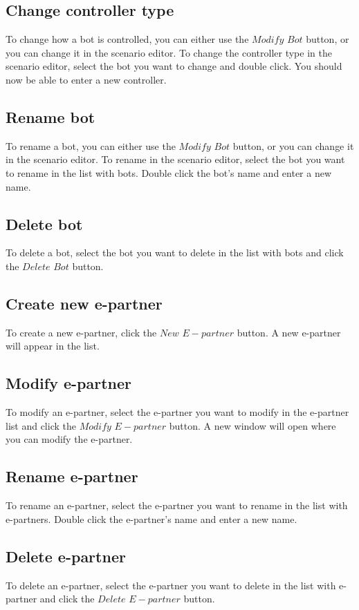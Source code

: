 \documentclass[a4paper]{article}
\begin{document}
\subsection{Change controller type}
To change how a bot is controlled, you can either use the $Modify$ $Bot$ button, or you can change it in the scenario editor. To change the controller type in the scenario editor, select the bot you want to change and double click. You should now be able to enter a new controller.

\subsection{Rename bot}
To rename a bot, you can either use the $Modify$ $Bot$ button, or you can change it in the scenario editor. To rename in the scenario editor, select the bot you want to rename in the list with bots. Double click the bot's name and enter a new name. %

\subsection{Delete bot}
To delete a bot, select the bot you want to delete in the list with bots and click the $Delete$ $Bot$ button.

\subsection{Create new e-partner}
To create a new e-partner, click the $New$ $E-partner$ button. A new e-partner will appear in the list.%

\subsection{Modify e-partner}
To modify an e-partner, select the e-partner you want to modify in the e-partner list and click the $Modify$ $E-partner$ button. A new window will open where you can modify the e-partner.

\subsection{Rename e-partner}
To rename an e-partner, select the e-partner you want to rename in the list with e-partners. Double click the e-partner's name and enter a new name. %

\subsection{Delete e-partner}
To delete an e-partner, select the e-partner you want to delete in the list with e-partner and click the $Delete$ $E-partner$ button.
\end{document}
